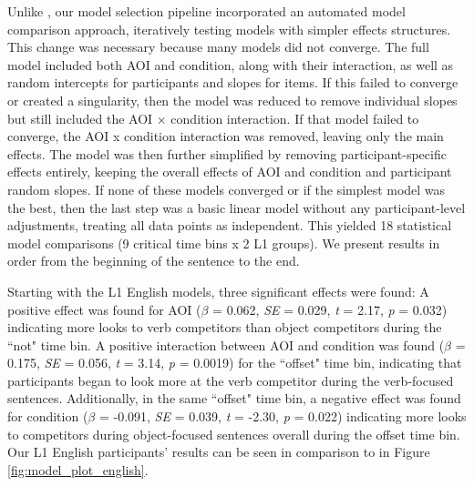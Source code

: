 Unlike \cite{Ge2021}, our model selection pipeline incorporated an automated model comparison approach, iteratively testing models with simpler effects structures. This change was necessary because many models did not converge. The full model included both AOI and condition, along with their interaction, as well as random intercepts for participants and slopes for items. If this failed to converge or created a singularity, then the model was reduced to remove individual slopes but still included the AOI × condition interaction. If that model failed to converge, the AOI x condition interaction was removed, leaving only the main effects. The model was then further simplified by removing participant-specific effects entirely, keeping the overall effects of AOI and condition and participant random slopes. If none of these models converged or if the simplest model was the best, then the last step was a basic linear model without any participant-level adjustments, treating all data points as independent. This yielded 18 statistical model comparisons (9 critical time bins x 2 L1 groups). We present results in order from the beginning of the sentence to the end. 

Starting with the L1 English models, three significant effects were found: A positive effect was found for AOI ($\beta$ = 0.062, \textit{SE} = 0.029, \textit{t} = 2.17, \textit{p} = 0.032) indicating more looks to verb competitors than object competitors during the ``not" time bin. A positive interaction between AOI and condition was found ($\beta$ = 0.175, \textit{SE} = 0.056, \textit{t} = 3.14, \textit{p} = 0.0019) for the ``offset" time bin, indicating that participants began to look more at the verb competitor during the verb-focused sentences. Additionally, in the same ``offset" time bin, a negative effect was found for condition ($\beta$ = -0.091, \textit{SE} = 0.039, \textit{t} = -2.30, \textit{p} = 0.022) indicating more looks to competitors during object-focused sentences overall during the offset time bin. Our L1 English participants' results can be seen in comparison to \cite{Ge2021} in Figure \ref{fig:model_plot_english}.

